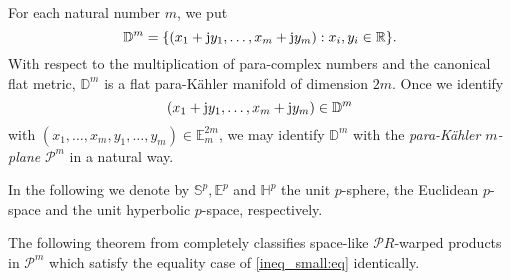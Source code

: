 \documentclass{amsart}
\theoremstyle{plain}
\numberwithin{equation}{section}
\theoremstyle{remark}
\numberwithin{equation}{section}
\begin{document}
For each natural number $m$, we put $$\mathbb D^{m}=\{(x_1+{{\rm j}} y_1,\ldots,x_m+{{\rm j}} y_m) : x_i, y_i\in{\mathbb{R}}\}.$$ With respect to the  multiplication of  para-complex numbers and the canonical flat metric,  $\mathbb D^{m}$ is a flat para-K\"ahler manifold of dimension $2m$. 
Once we  identify $$(x_1+{{\rm j}} y_1,\ldots,x_m+{{\rm j}} y_m)\in \mathbb D^{m}$$ with $(x_1,\ldots,x_m,y_1,\ldots,y_m)\in {\mathbb{E}}^{2m}_m$, we may identify $\mathbb D^{m}$ with the {\it para-K\"ahler $m$-plane} ${{\mathcal{P}}}^{m}$ in a natural way.

In the following we denote by $\mathbb S^{p}, \mathbb E^{p}$ and  $\mathbb  H^{p}$ the unit $p$-sphere, the Euclidean $p$-space and the unit hyperbolic $p$-space, respectively.

The following theorem from \cite{CMu12} completely classifies space-like ${{\mathcal{P}}} R$-warped products  in ${{\mathcal{P}}}^{m}$  which satisfy the equality case of \eqref{ineq_small:eq} identically.
\end{document}
